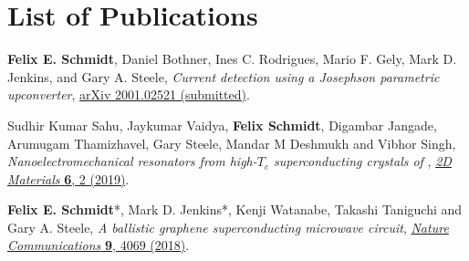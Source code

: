 \chapter*{List of Publications}
\label{publications}

\begin{etaremune}{\small

\item \textbf{Felix E. Schmidt}, Daniel Bothner, Ines C. Rodrigues, Mario F. Gely, Mark D. Jenkins, and Gary A. Steele, \textit{Current detection using a Josephson parametric upconverter}, \href{https://arxiv.org/abs/2001.02521}{arXiv 2001.02521 (submitted)}.

\item Sudhir Kumar Sahu, Jaykumar Vaidya, \textbf{Felix Schmidt}, Digambar Jangade, Arumugam Thamizhavel, Gary Steele, Mandar M Deshmukh and Vibhor Singh, \textit{Nanoelectromechanical resonators from high-$T_c$ superconducting crystals of  }, \href{https://doi.org/10.1088/2053-1583/ab0800}{\textit{2D Materials} \textbf{6}, 2 (2019)}.

\item \textbf{Felix E. Schmidt}*, Mark D. Jenkins*, Kenji Watanabe, Takashi Taniguchi and Gary A. Steele, \textit{A ballistic graphene superconducting microwave circuit}, \href{https://doi.org/10.1038/s41467-018-06595-2}{\textit{Nature Communications} \textbf{9}, 4069 (2018)}.

}\end{etaremune}

